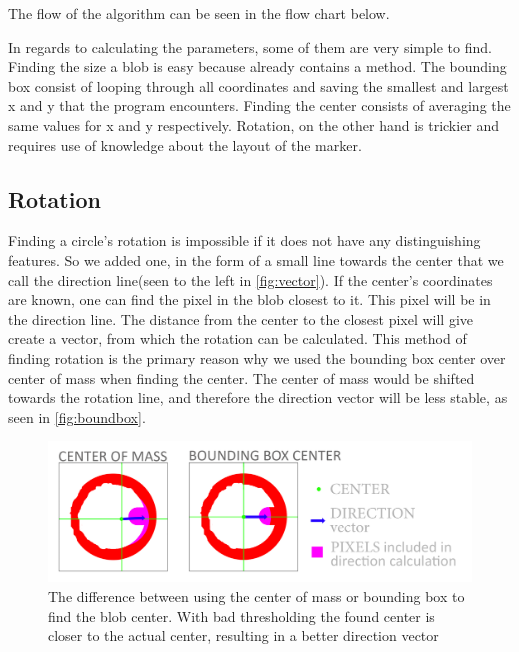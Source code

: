 The flow of the algorithm can be seen in the flow chart below.\\

In regards to calculating the parameters, some of them are very simple to find. Finding the size a blob is easy because  already contains a  method. The bounding box consist of looping through all coordinates and saving the smallest and largest x and y that the program encounters. Finding the center consists of averaging the same values for x and y respectively. Rotation, on the other hand is trickier and requires use of knowledge about the layout of the marker.
  
\subsection{Rotation}
Finding a circle's rotation is impossible if it does not have any distinguishing features. So we added one, in the form of a small line towards the center that we call the direction line(seen to the left in \autoref{fig:vector}). If the center's coordinates are known, one can find the pixel in the blob closest to it. This pixel will be in the direction line. The distance from the center to the closest pixel will give create a vector, from which the rotation can be calculated. This method of finding rotation is the primary reason why we used the bounding box center over center of mass when finding the center. The center of mass would be shifted towards the rotation line, and therefore the direction vector will be less stable, as seen in \autoref{fig:boundbox}.\\
\begin{figure}[H]
	\centering
	\includegraphics[width=1\linewidth]{figure/Analysis/boundingbox.png}
	\caption{The difference between using the center of mass or bounding box to find the blob center. With bad thresholding the found center is closer to the actual center, resulting in a better direction vector} 
	\label{fig:boundbox}
\end{figure}
